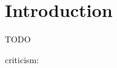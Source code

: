 \section{Introduction} \label{sec:introduction}

TODO

criticism: \citep{moore2023evolution,woodward2009evolution}
